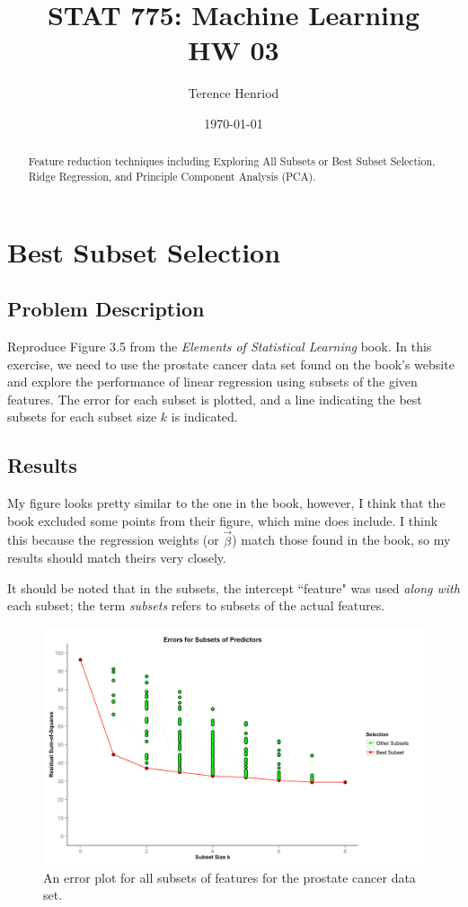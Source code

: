 \documentclass{article}
\title{STAT 775: Machine Learning \\ HW 03}
\author{Terence Henriod}
\date{\today}
\begin{document}
\clearpage            %
\maketitle            %
\thispagestyle{empty} %

\begin{abstract}
Feature reduction techniques including Exploring All Subsets or Best Subset Selection, Ridge Regression, and Principle Component Analysis (PCA).
\end{abstract}

\newpage
\section{Best Subset Selection}
\subsection{Problem Description}
Reproduce Figure 3.5 from the \emph{Elements of Statistical Learning} book. In this exercise, we need to use the prostate cancer data set found on the book's website and explore the performance of linear regression using subsets of the given features. The error for each subset is plotted, and a line indicating the best subsets for each subset size $k$ is indicated.

\subsection{Results}
My figure looks pretty similar to the one in the book, however, I think that the book excluded some points from their figure, which mine does include. I think this because the regression weights (or $\vec{\beta}$) match those found in the book, so my results should match theirs very closely.

It should be noted that in the subsets, the intercept ``feature" was used \emph{along with} each subset; the term \emph{subsets} refers to subsets of the actual features.

  \begin{figure}[h!]
    \centering
    \includegraphics[width=.8\linewidth]{HW03_Exercise01}
    \caption{An error plot for all subsets of features for the prostate cancer data set.}
    \label{fig:HW03_Exercise01}
  \end{figure}
\end{document}

